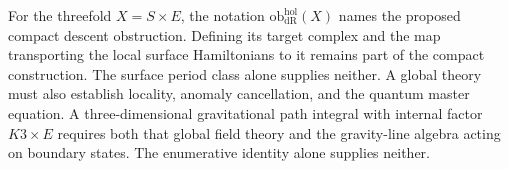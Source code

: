 For the threefold \(X=S\times E\), the notation
\(\mathrm{ob}^{\mathrm{hol}}_{\mathrm{dR}}(X)\) names the proposed
compact descent obstruction. Defining its target complex and the
map transporting the local surface Hamiltonians to it remains part
of the compact construction. The surface period class alone supplies
neither. A global theory must also establish locality,
anomaly cancellation, and the quantum master equation. A
three-dimensional gravitational path integral with internal factor
\(K3\times E\) requires both that global field theory and the
gravity-line algebra acting on boundary states. The enumerative
identity alone supplies neither.

\cleardoublepage
